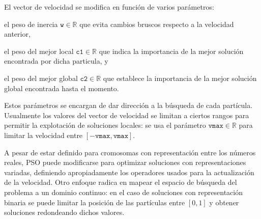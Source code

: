 El vector de velocidad se modifica en función de varios parámetros:
\begin{inparaenum}
\item el peso de inercia $\texttt{w} \in \mathbb{R}$ que evita cambios bruscos respecto a la velocidad anterior,
\item el peso del mejor local $\texttt{c1} \in \mathbb{R}$ que indica la importancia de la mejor solución encontrada por dicha particula, y
\item  el peso del mejor global $\texttt{c2} \in \mathbb{R}$ que establece la importancia de la mejor solución global encontrada hasta el momento.
\end{inparaenum}
Estos parámetros se encargan de dar dirección a la búsqueda de cada partícula. Usualmente los valores del vector de velocidad se limitan a ciertos rangos para permitir la explotación de soluciones locales: se usa el parámetro $\texttt{vmax} \in \mathbb{R}$ para limitar la velocidad entre $[-\texttt{vmax},\texttt{vmax}]$.

A pesar de estar definido para cromosomas con representación entre los números reales, PSO puede modificarse para optimizar soluciones con representaciones variadas, definiendo apropiadamente los operadores usados para la actualización de la velocidad. Otro enfoque radica en mapear el espacio de búsqueda del problema a un dominio continuo: en el caso de soluciones con representación binaria se puede limitar la posición de las partículas entre $[0,1]$ y obtener soluciones redondeando dichos valores.
